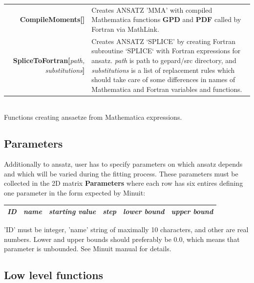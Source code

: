 \documentclass[12pt]{article}
\newcommand{\defboxitem}[3]{ {\ttfamily \bfseries #1[}\emph{#2}{\ttfamily \bfseries ]} & #3 }
\newcommand{\mmacomm}[1]{ {\ttfamily \bfseries #1} }
\begin{document}
\begin{flushleft}
\colorbox{defbox}{%
\begin{minipage}{\textwidth}%
\begin{tabular}{rp{8cm}}%
\defboxitem{CompileMoments}{}{Creates ANSATZ 'MMA' with compiled Mathematica 
functions \mmacomm{GPD} and \mmacomm{PDF} called by Fortran via MathLink.} \\[0.8ex]
\defboxitem{SpliceToFortran}{path, substitutions}{Creates ANSATZ `SPLICE' by
creating  Fortran subroutine `SPLICE` with Fortran expressions for ansatz.
\emph{path} is path to gepard/src directory, and 
\emph{substitutions} is a list of replacement rules which should take care of some 
differences in names of Mathematica and Fortran variables and functions.} 
\end{tabular}%
\end{minipage}}\\[0.5ex]
{\small Functions creating ansaetze from Mathematica expressions.}
\end{flushleft}

\subsection{Parameters}

Additionally to ansatz, user has to specify parameters on which ansatz depends and
which will be varied during the fitting process. These parameters must be collected
in the 2D matrix \mmacomm{Parameters} where each row has six entires defining one 
parameter in the form expected by Minuit:

\vspace*{2ex}

\begin{tabular}[h]{|c|c|c|c|c|c|}
\hline
\emph{ID} & \emph{name} & \emph{starting value} & \emph{step} & \emph{lower bound} & 
\emph{upper bound} \\
\hline
\end{tabular}

\vspace*{2ex}

'ID' must be integer, 'name' string of maximally 10 characters, and other are real numbers.
Lower and upper bounds should preferably be 0.0, which means that parameter is unbounded.
See Minuit manual for details.

\subsection{Low level functions}
\end{document}

